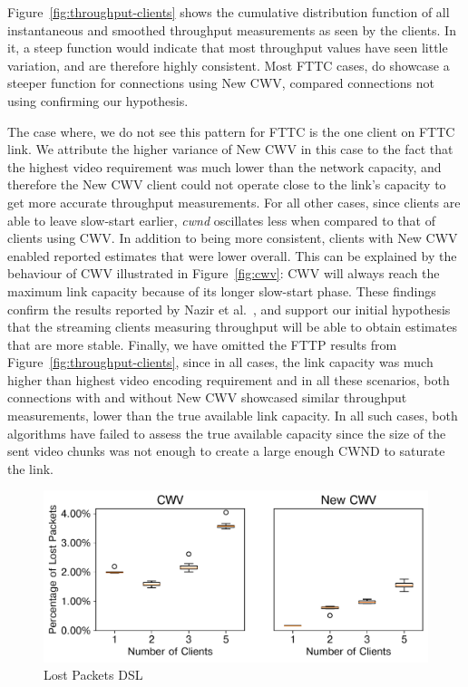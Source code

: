 \documentclass[10pt,sigconf]{acmart}
\begin{document}
Figure~\ref{fig:throughput-clients} shows the cumulative distribution function of all instantaneous and smoothed throughput measurements as seen by the clients. In it, a steep function would indicate that most throughput values have seen little variation, and are therefore highly consistent. Most FTTC cases, do showcase a steeper function for connections using New CWV, compared connections not using confirming our hypothesis. 

The case where, we do not see this pattern for FTTC is the one client on FTTC link. We attribute the higher variance of New CWV in this case to the fact that the highest video requirement was much lower than the network capacity, and therefore the New CWV client could not operate close to the link's capacity to get more accurate throughput measurements. For all other cases, since clients are able to leave slow-start earlier, \emph{cwnd} oscillates less when compared to that of clients using CWV. In addition to being more consistent, clients with New CWV enabled reported estimates that were lower overall. This can be explained by the behaviour of CWV illustrated in Figure~\ref{fig:cwv}: CWV will always reach the maximum link capacity because of its longer slow-start phase. These findings confirm the results reported by Nazir et al.~\cite{Nazir-2014-performance-evaluation-congestion-window-validation-dash-newcwv}, and support our initial hypothesis that the streaming clients measuring throughput will be able to obtain estimates that are more stable. Finally, we have omitted the FTTP results from Figure~\ref{fig:throughput-clients}, since in all cases, the link capacity was much higher than highest video encoding requirement and in all these scenarios, both connections with and without New CWV showcased similar throughput measurements, lower than the true available link capacity. In all such cases, both algorithms have failed to assess the true available capacity since the size of the sent video chunks was not enough to create a large enough CWND to saturate the link.

\begin{figure}[t!]
  \centering
  \includegraphics[width=.45\textwidth]{figures/lost_packets.pdf}
  \caption{Lost Packets DSL}
  \label{fig:lost-packets}
\end{figure}
\end{document}
